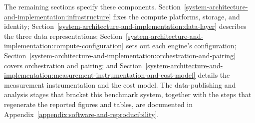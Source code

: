 The remaining sections specify these components. Section~\ref{system-architecture-and-implementation:infrastructure} fixes the compute platforms, storage, and identity; Section~\ref{system-architecture-and-implementation:data-layer} describes the three data representations; Section~\ref{system-architecture-and-implementation:compute-configuration} sets out each engine's configuration; Section~\ref{system-architecture-and-implementation:orchestration-and-pairing} covers orchestration and pairing; and Section~\ref{system-architecture-and-implementation:measurement-instrumentation-and-cost-model} details the measurement instrumentation and the cost model. The data-publishing and analysis stages that bracket this benchmark system, together with the steps that regenerate the reported figures and tables, are documented in Appendix~\ref{appendix:software-and-reproducibility}.